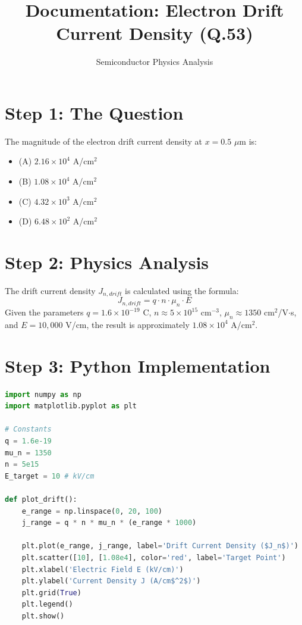 \documentclass[11pt]{article}
\begin{document}
\title{Documentation: Electron Drift Current Density (Q.53)}
\author{Semiconductor Physics Analysis}
\date{}
\maketitle

\section{Step 1: The Question}
The magnitude of the electron drift current density at $x = 0.5$ $\mu$m is:
\begin{itemize}
    \item (A) $2.16 \times 10^4$ A/cm$^2$
    \item (B) $1.08 \times 10^4$ A/cm$^2$
    \item (C) $4.32 \times 10^3$ A/cm$^2$
    \item (D) $6.48 \times 10^2$ A/cm$^2$
\end{itemize}

\section{Step 2: Physics Analysis}
The drift current density $J_{n,drift}$ is calculated using the formula:
$$J_{n,drift} = q \cdot n \cdot \mu_n \cdot E$$
Given the parameters $q = 1.6 \times 10^{-19}$ C, $n \approx 5 \times 10^{15}$ cm$^{-3}$, $\mu_n \approx 1350$ cm$^2$/V$\cdot$s, and $E = 10,000$ V/cm, the result is approximately $1.08 \times 10^4$ A/cm$^2$.

\section{Step 3: Python Implementation}
\begin{lstlisting}[language=Python]
import numpy as np
import matplotlib.pyplot as plt

# Constants
q = 1.6e-19
mu_n = 1350
n = 5e15
E_target = 10 # kV/cm

def plot_drift():
    e_range = np.linspace(0, 20, 100)
    j_range = q * n * mu_n * (e_range * 1000)
    
    plt.plot(e_range, j_range, label='Drift Current Density ($J_n$)')
    plt.scatter([10], [1.08e4], color='red', label='Target Point')
    plt.xlabel('Electric Field E (kV/cm)')
    plt.ylabel('Current Density J (A/cm$^2$)')
    plt.grid(True)
    plt.legend()
    plt.show()
\end{lstlisting}
\end{document}
